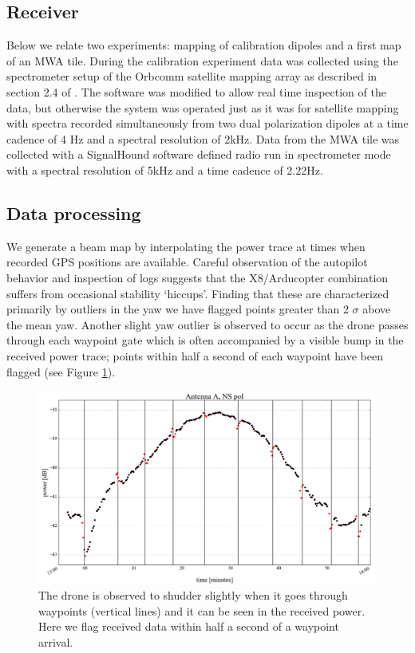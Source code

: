 \documentclass[preprint2,numberedappendix,tighten,twocolappendix]{aastex6}
\begin{document}
\subsection{Receiver}
Below we relate two experiments: mapping of calibration dipoles and a first map of an MWA tile. During the calibration experiment data was collected using the spectrometer setup of the Orbcomm satellite mapping array as described in section 2.4 of \citet{2016:NebenHERAdish}. The software was modified to allow real time inspection of the data, but otherwise the system was operated just as it was for satellite mapping with spectra recorded simultaneously from two dual polarization dipoles at a time cadence of 4 Hz and a spectral resolution of 2kHz. Data from the MWA tile was collected with a SignalHound software defined radio run in spectrometer mode with a spectral resolution of 5kHz and a time cadence of 2.22Hz. 
\subsection{Data processing}
We generate a beam map by interpolating the power trace at times when recorded GPS positions are available.  Careful observation of the autopilot behavior and inspection of logs suggests that the X8/Arducopter combination suffers from occasional stability `hiccups'. Finding that these are characterized primarily by outliers in the yaw we have flagged points greater than 2 $\sigma$ above the mean yaw.  Another slight yaw outlier is observed to occur as the drone passes through each waypoint gate which is often accompanied by a visible bump in the received power trace; points within half a second of each waypoint have been flagged (see Figure \ref{fig:waypoint_flagging}).

\begin{figure}[htb]
\includegraphics[width=\columnwidth]{figures/GB_waypoint_flagging_zoom.png}
\caption{The drone is observed to shudder slightly when it goes through waypoints (vertical lines) and it can be seen in the received power. Here we flag received data within half a second of a waypoint arrival.}
\label{fig:waypoint_flagging}
\end{figure}
\end{document}
